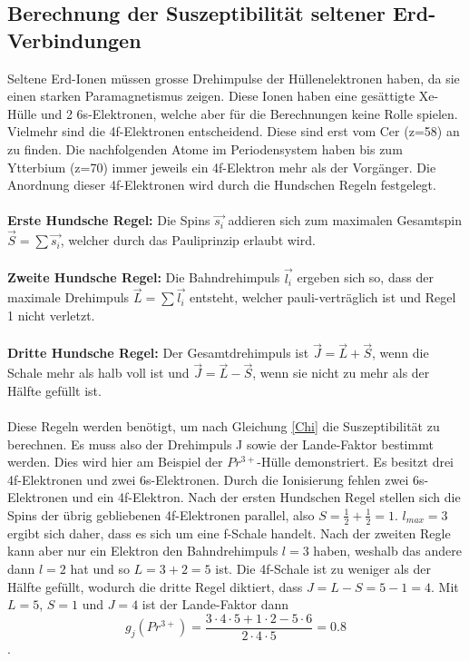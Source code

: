 \subsection{Berechnung der Suszeptibilität seltener Erd-Verbindungen}
Seltene Erd-Ionen müssen grosse Drehimpulse der Hüllenelektronen haben, da sie einen starken Paramagnetismus zeigen. Diese Ionen haben eine gesättigte Xe-Hülle und 2 6s-Elektronen, welche aber für die Berechnungen keine Rolle spielen. Vielmehr sind die 4f-Elektronen entscheidend. Diese sind erst vom Cer (z=58) an zu finden. Die nachfolgenden Atome im Periodensystem haben bis zum Ytterbium (z=70) immer jeweils ein 4f-Elektron mehr als der Vorgänger. Die Anordnung dieser 4f-Elektronen wird durch die Hundschen Regeln festgelegt.\\\\
\textbf{Erste Hundsche Regel:} Die Spins $\vec{s_i}$ addieren sich zum maximalen Gesamtspin $\vec{S}=\sum\vec{s_i}$, welcher durch das Pauliprinzip erlaubt wird.\\\\
\textbf{Zweite Hundsche Regel:} Die Bahndrehimpuls $\vec{l_i}$ ergeben sich so, dass der maximale Drehimpuls $\vec{L}=\sum\vec{l_i}$ entsteht, welcher pauli-verträglich ist und Regel 1 nicht verletzt.\\\\
\textbf{Dritte Hundsche Regel:} Der Gesamtdrehimpuls ist $\vec{J}=\vec{L}+\vec{S}$, wenn die Schale mehr als halb voll ist und $\vec{J}=\vec{L}-\vec{S}$, wenn sie nicht zu mehr als der Hälfte gefüllt ist.\\\\
Diese Regeln werden benötigt, um nach Gleichung \ref{Chi} die Suszeptibilität zu berechnen. Es muss also der Drehimpuls J sowie der Lande-Faktor bestimmt werden. Dies wird hier am Beispiel der $Pr^{3+}$-Hülle demonstriert. Es besitzt drei 4f-Elektronen und zwei 6s-Elektronen. Durch die Ionisierung fehlen zwei 6s-Elektronen und ein 4f-Elektron. Nach der ersten Hundschen Regel stellen sich die Spins der übrig gebliebenen 4f-Elektronen parallel, also $S=\frac{1}{2}+\frac{1}{2}=1$. $l_{max}=3$ ergibt sich daher, dass es sich um eine f-Schale handelt. Nach der zweiten Regle kann aber nur ein Elektron den Bahndrehimpuls $l=3$ haben, weshalb das andere dann $l=2$ hat und so $L=3+2=5$ ist. Die 4f-Schale ist zu weniger als der Hälfte gefüllt, wodurch die dritte Regel diktiert, dass $J=L-S=5-1=4$. Mit $L=5$, $S=1$ und $J=4$ ist der Lande-Faktor dann 
\begin{equation*}
    g_j(Pr^{3+})=\frac{3\cdot 4\cdot 5+1\cdot 2-5\cdot 6}{2\cdot 4\cdot 5}=0.8
\end{equation*}.
